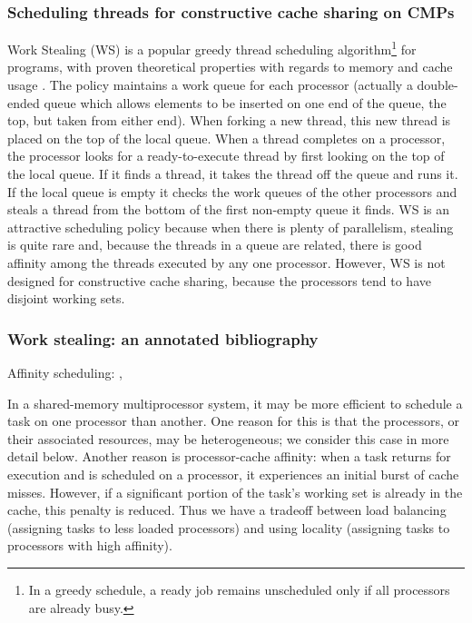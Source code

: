 \subsubsection{Scheduling threads for constructive cache sharing on
  CMPs \cite{Chen2007}}

Work Stealing (WS) is a popular greedy thread scheduling
algorithm\footnote{In a greedy schedule, a ready job remains
  unscheduled only if all processors are already busy.} for programs,
with proven theoretical properties with regards to memory and cache
usage \cite{Blumofe1998, Blumofe1999, Acar2002}. The policy maintains
a work queue for each processor (actually a double-ended queue which
allows elements to be inserted on one end of the queue, the top, but
taken from either end). When forking a new thread, this new thread is
placed on the top of the local queue. When a thread completes on a
processor, the processor looks for a ready-to-execute thread by first
looking on the top of the local queue. If it finds a thread, it takes
the thread off the queue and runs it. If the local queue is empty it
checks the work queues of the other processors and steals a thread
from the bottom of the first non-empty queue it finds. WS is an
attractive scheduling policy because when there is plenty of
parallelism, stealing is quite rare and, because the threads in a
queue are related, there is good affinity among the threads executed
by any one processor. However, WS is not designed for constructive
cache sharing, because the processors tend to have disjoint working
sets.

\subsubsection{Work stealing: an annotated bibliography}

Affinity scheduling: \cite{Squillante1993}, \cite{Acar2002}

In a shared-memory multiprocessor system, it may be more efficient to
schedule a task on one processor than another. One reason for this is
that the processors, or their associated resources, may be
heterogeneous; we consider this case in more detail below. Another
reason is processor-cache affinity: when a task returns for execution
and is scheduled on a processor, it experiences an initial burst of
cache misses. However, if a significant portion of the task's working
set is already in the cache, this penalty is reduced. Thus we have a
tradeoff between load balancing (assigning tasks to less loaded
processors) and using locality (assigning tasks to processors with
high affinity).

